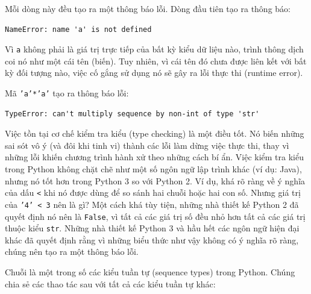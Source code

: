 Mỗi dòng này đều tạo ra một thông báo lỗi. Dòng đầu tiên tạo ra thông báo:

\begin{verbatim}
NameError: name 'a' is not defined
\end{verbatim}

Vì \texttt{a} không phải là giá trị trực tiếp của bất kỳ kiểu dữ liệu nào, trình thông dịch coi nó như một cái tên (biến). Tuy nhiên, vì cái tên đó chưa được liên kết với bất kỳ đối tượng nào, việc cố gắng sử dụng nó sẽ gây ra lỗi thực thi (runtime error).

Mã \texttt{'a'*'a'} tạo ra thông báo lỗi:

\begin{verbatim}
TypeError: can't multiply sequence by non-int of type 'str'
\end{verbatim}

Việc tồn tại cơ chế kiểm tra kiểu (type checking) là một điều tốt. Nó biến những sai sót vô ý (và đôi khi tinh vi) thành các lỗi làm dừng việc thực thi, thay vì những lỗi khiến chương trình hành xử theo những cách bí ẩn. Việc kiểm tra kiểu trong Python không chặt chẽ như một số ngôn ngữ lập trình khác (ví dụ: Java), nhưng nó tốt hơn trong Python 3 so với Python 2. Ví dụ, khá rõ ràng về ý nghĩa của dấu \texttt{<} khi nó được dùng để so sánh hai chuỗi hoặc hai con số. Nhưng giá trị của \texttt{'4' < 3} nên là gì? Một cách khá tùy tiện, những nhà thiết kế Python 2 đã quyết định nó nên là \texttt{False}, vì tất cả các giá trị số đều nhỏ hơn tất cả các giá trị thuộc kiểu \texttt{str}. Những nhà thiết kế Python 3 và hầu hết các ngôn ngữ hiện đại khác đã quyết định rằng vì những biểu thức như vậy không có ý nghĩa rõ ràng, chúng nên tạo ra một thông báo lỗi.

Chuỗi là một trong số các kiểu tuần tự (sequence types) trong Python. Chúng chia sẻ các thao tác sau với tất cả các kiểu tuần tự khác:

